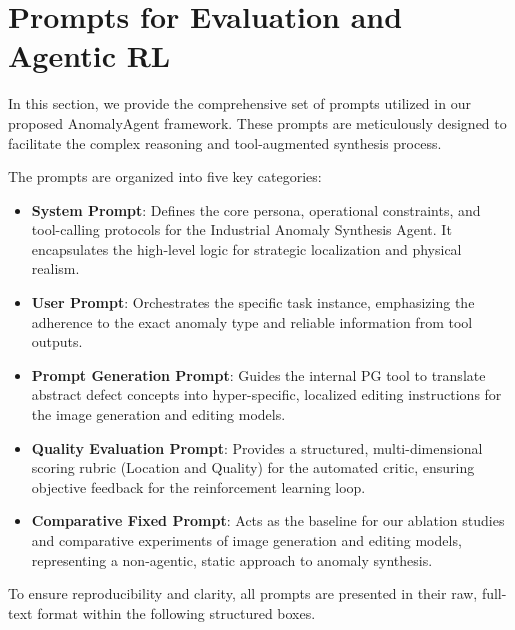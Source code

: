 \documentclass[sigconf]{acmart}
\begin{document}
\section{Prompts for Evaluation and Agentic RL}

In this section, we provide the comprehensive set of prompts utilized in our proposed AnomalyAgent framework. These prompts are meticulously designed to facilitate the complex reasoning and tool-augmented synthesis process. 

The prompts are organized into five key categories:
\begin{itemize}
    \item \textbf{System Prompt}: Defines the core persona, operational constraints, and tool-calling protocols for the Industrial Anomaly Synthesis Agent. It encapsulates the high-level logic for strategic localization and physical realism.
    \item \textbf{User Prompt}: Orchestrates the specific task instance, emphasizing the adherence to the exact anomaly type and reliable information from tool outputs.
    \item \textbf{Prompt Generation Prompt}: Guides the internal PG tool to translate abstract defect concepts into hyper-specific, localized editing instructions for the image generation and editing models.
    \item \textbf{Quality Evaluation Prompt}: Provides a structured, multi-dimensional scoring rubric (Location and Quality) for the automated critic, ensuring objective feedback for the reinforcement learning loop.
    \item \textbf{Comparative Fixed Prompt}: Acts as the baseline for our ablation studies and comparative experiments of image generation and editing models, representing a non-agentic, static approach to anomaly synthesis.
\end{itemize}

To ensure reproducibility and clarity, all prompts are presented in their raw, full-text format within the following structured boxes.

\clearpage 

\onecolumn 
\end{document}
